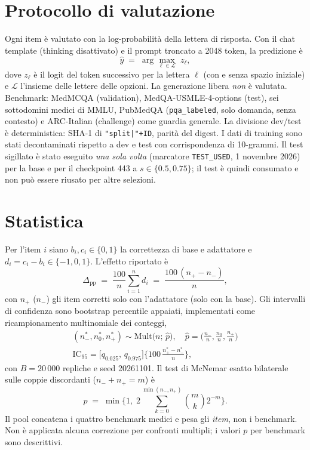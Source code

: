 \documentclass[11pt,a4paper]{article}
\begin{document}
\section{Protocollo di valutazione}
Ogni item è valutato con la log-probabilità della lettera di risposta. Con il chat template (thinking disattivato) e il prompt troncato a 2048 token, la predizione è
\begin{equation}\label{eq:mc}
\hat y \;=\; \arg\max_{\ell\in\mathcal{L}} \; z_\ell ,
\end{equation}
dove $z_\ell$ è il logit del token successivo per la lettera $\ell$ (con e senza spazio iniziale) e $\mathcal{L}$ l'insieme delle lettere delle opzioni. La generazione libera \emph{non} è valutata. Benchmark: MedMCQA (validation), MedQA-USMLE-4-options (test), sei sottodomini medici di MMLU, PubMedQA (\texttt{pqa\_labeled}, solo domanda, senza contesto) e ARC-Italian (challenge) come guardia generale. La divisione dev/test è deterministica: SHA-1 di \texttt{"split|"+ID}, parità del digest. I dati di training sono stati decontaminati rispetto a dev e test con corrispondenza di 10-grammi. Il test sigillato è stato eseguito \emph{una sola volta} (marcatore \texttt{TEST\_USED}, 1 novembre 2026) per la base e per il checkpoint 443 a $s\in\{0.5,0.75\}$; il test è quindi consumato e non può essere riusato per altre selezioni.

\section{Statistica}
Per l'item $i$ siano $b_i,c_i\in\{0,1\}$ la correttezza di base e adattatore e $d_i=c_i-b_i\in\{-1,0,1\}$. L'effetto riportato è
\begin{equation}\label{eq:delta}
\Delta_{\mathrm{pp}} \;=\; \frac{100}{n}\sum_{i=1}^{n} d_i \;=\; \frac{100\,(n_{+}-n_{-})}{n},
\end{equation}
con $n_+$ ($n_-$) gli item corretti solo con l'adattatore (solo con la base). Gli intervalli di confidenza sono bootstrap percentile appaiati, implementati come ricampionamento multinomiale dei conteggi,
\begin{equation}\label{eq:boot}
\begin{gathered}
(n_-^*,n_0^*,n_+^*)\sim\mathrm{Mult}\!\big(n;\,\hat p\big),\quad \hat p=\big(\tfrac{n_-}{n},\tfrac{n_0}{n},\tfrac{n_+}{n}\big)\\[3pt] \mathrm{IC}_{95}=\big[q_{0.025},\,q_{0.975}\big]\big\{100\,\tfrac{n_+^*-n_-^*}{n}\big\},
\end{gathered}\end{equation}
con $B=20\,000$ repliche e seed 20261101. Il test di McNemar esatto bilaterale sulle coppie discordanti ($n_-+n_+=m$) è
\begin{equation}\label{eq:mcn}
p \;=\; \min\Big\{1,\; 2\sum_{k=0}^{\min(n_-,n_+)}\binom{m}{k}2^{-m}\Big\}.
\end{equation}
Il pool concatena i quattro benchmark medici e pesa gli \emph{item}, non i benchmark. Non è applicata alcuna correzione per confronti multipli; i valori $p$ per benchmark sono descrittivi.
\end{document}
